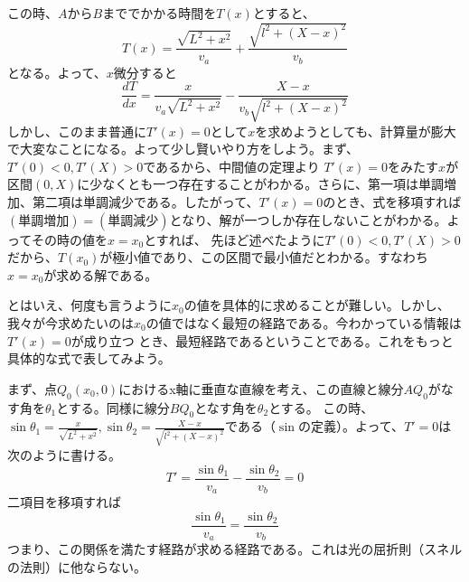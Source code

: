 \documentclass[a4j,dvipdfmx]{jsarticle}
\begin{document}
                        この時、$A$から$B$まででかかる時間を$T(x)$とすると、
                        \begin{equation*}
                            T(x)=\frac{\sqrt{L^2+x^2}}{v_a}+\frac{\sqrt{l^2+(X-x)^2}}{v_b}
                        \end{equation*}
                        となる。よって、$x$微分すると
                        \begin{equation*}
                            \frac{dT}{dx} = \frac{x}{v_a \sqrt{L^2+x^2}}-\frac{X-x}{v_b\sqrt{l^2+(X-x)^2}}
                        \end{equation*}
                        しかし、このまま普通に$T'(x)=0$として$x$を求めようとしても、計算量が膨大で大変なことになる。よって少し賢いやり方をしよう。まず、$T'(0)<0,T'(X)>0$であるから、中間値の定理より
                        $T'(x)=0$をみたす$x$が区間$(0,X)$に少なくとも一つ存在することがわかる。さらに、第一項は単調増加、第二項は単調減少である。したがって、$T'(x)=0$のとき、式を移項すれば
                        $(\text{単調増加})=(\text{単調減少})$となり、解が一つしか存在しないことがわかる。よってその時の値を$x=x_0$とすれば、
                        先ほど述べたように$T'(0)<0,T'(X)>0$だから、$T(x_0)$が極小値であり、この区間で最小値だとわかる。すなわち$x=x_0$が求める解である。

                        とはいえ、何度も言うように$x_0$の値を具体的に求めることが難しい。しかし、我々が今求めたいのは$x_0$の値ではなく最短の経路である。今わかっている情報は$T'(x)=0$が成り立つ
                        とき、最短経路であるということである。これをもっと具体的な式で表してみよう。

                        まず、点$Q_0(x_0,0)$におけるx軸に垂直な直線を考え、この直線と線分$AQ_0$がなす角を$\theta_1$とする。同様に線分$BQ_0$となす角を$\theta_2$とする。
                        この時、$\displaystyle \sin\theta_1 = \frac{x}{\sqrt{L^2+x^2}},\sin\theta_2 = \frac{X-x}{\sqrt{l^2+(X-x)^2}}$である（$\sin$の定義）。よって、$T'=0$は次のように書ける。
                        \begin{equation*}
                            T'=\frac{\sin \theta_1}{v_a}-\frac{\sin\theta_2}{v_b}=0
                        \end{equation*}
                        二項目を移項すれば
                        \begin{equation*}
                            \frac{\sin\theta_1}{v_a}=\frac{\sin\theta_2}{v_b}
                        \end{equation*}
                        つまり、この関係を満たす経路が求める経路である。これは光の屈折則（スネルの法則）に他ならない。
\end{document}

